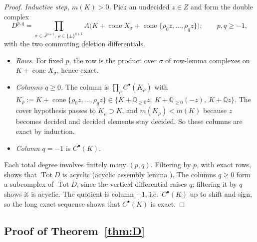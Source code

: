 \documentclass[11pt]{article}
\theoremstyle{definition}
\theoremstyle{remark}
\newcommand{\QQ}{\mathbb{Q}}
\newcommand{\cone}{\operatorname{cone}}
\begin{document}
\begin{proof}
\emph{Inductive step, $m(K)>0$.} Pick an undecided $z\in Z$ and form the double complex
\[
D^{p,q}=\prod_{\sigma\in J^{p+1},\ \rho\in\{\pm\}^{q+1}}A\bigl(K+\cone X_\sigma+\cone\{\rho_0z,\dots,\rho_qz\}\bigr),\qquad p,q\ge-1,
\]
with the two commuting deletion differentials.
\begin{itemize}
\item \emph{Rows.} For fixed $p$, the row is the product over $\sigma$ of row-lemma complexes on $K+\cone X_\sigma$, hence exact.
\item \emph{Columns $q\ge0$.} The column is $\prod_\rho C^\bullet(K_\rho)$ with $K_\rho:=K+\cone\{\rho_0z,\dots,\rho_qz\}\in\{K+\QQ_{\ge0}z,\ K+\QQ_{\ge0}(-z),\ K+\QQ z\}$. The cover hypothesis passes to $K_\rho\supset K$, and $m(K_\rho)<m(K)$ because $z$ becomes decided and decided elements stay decided. So these columns are exact by induction.
\item \emph{Column $q=-1$} is $C^\bullet(K)$.
\end{itemize}
Each total degree involves finitely many $(p,q)$. Filtering by $p$, with exact rows, shows that $\operatorname{Tot}D$ is acyclic (acyclic assembly lemma \cite[\S2.7]{Weibel}). The columns $q\ge0$ form a subcomplex of $\operatorname{Tot}D$, since the vertical differential raises $q$; filtering it by $q$ shows it is acyclic. The quotient is column $-1$, i.e.\ $C^\bullet(K)$ up to shift and sign, so the long exact sequence shows that $C^\bullet(K)$ is exact.
\end{proof}

\subsection{Proof of Theorem~\ref{thm:D}}
\end{document}
